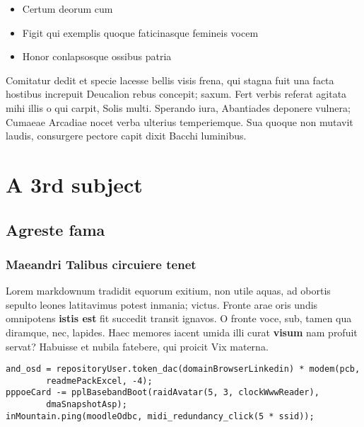\documentclass[
  12pt,
  a4paper,
  oneside,tablecaptionabove
]{scrbook}
\providecommand{\tightlist}{%
  \setlength{\itemsep}{0pt}\setlength{\parskip}{0pt}}
\def \logbuchsubjectmark {}
\def \logbuchsubjectdatemark {}
\def \logbuchsubjectauthmark {}
\begin{document}
\begin{itemize}
\tightlist
\item
  Certum deorum cum
\item
  Figit qui exemplis quoque faticinasque femineis vocem
\item
  Honor conlapsosque ossibus patria
\end{itemize}

Comitatur dedit et specie lacesse bellis visis frena, qui stagna fuit
una facta hostibus increpuit Deucalion rebus concepit; saxum. Fert
verbis referat agitata mihi illis o qui carpit, Solis multi. Sperando
iura, Abantiades deponere vulnera; Cumaeae Arcadiae nocet verba ulterius
temperiemque. Sua quoque non mutavit laudis, consurgere pectore capit
dixit Bacchi luminibus.

\chapter*{\LARGE{A 3rd subject}}

\setcounter{section}{0}

\def \logbuchsubjectmark {A 3rd subject}
\def \logbuchsubjectdatemark {09.03.2019 01:00}
\def \logbuchsubjectauthmark {\textit{bertolino}}
\thispagestyle{eisvogel-header-footer}
\hypertarget{agreste-fama}{%
\section{Agreste fama}\label{agreste-fama}}

\hypertarget{maeandri-talibus-circuiere-tenet}{%
\subsection{Maeandri Talibus circuiere
tenet}\label{maeandri-talibus-circuiere-tenet}}

Lorem markdownum tradidit equorum exitium, non utile aquas, ad obortis
sepulto leones latitavimus potest inmania; victus. Fronte arae oris
undis omnipotens \textbf{istis est} fit succedit transit ignavos. O
fronte voce, sub, tamen qua diramque, nec, lapides. Haec memores iacent
umida illi curat \textbf{visum} nam profuit servat? Habuisse et nubila
fatebere, qui proicit Vix materna.

\begin{lstlisting}
and_osd = repositoryUser.token_dac(domainBrowserLinkedin) * modem(pcb,
        readmePackExcel, -4);
pppoeCard -= pplBasebandBoot(raidAvatar(5, 3, clockWwwReader),
        dmaSnapshotAsp);
inMountain.ping(moodleOdbc, midi_redundancy_click(5 * ssid));
\end{lstlisting}
\end{document}
